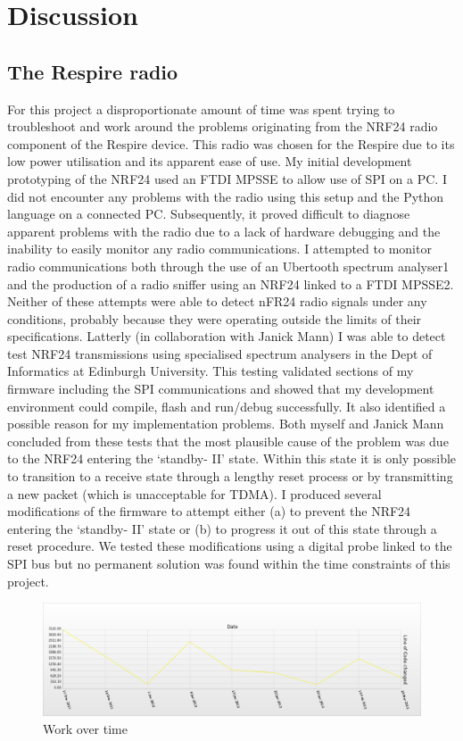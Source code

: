\chapter{Discussion}

\section{The Respire radio}
For this project a disproportionate amount of time was spent trying to troubleshoot and work
around the problems originating from the NRF24 radio component of the Respire device. This radio
was chosen for the Respire due to its low power utilisation and its apparent ease of use. My initial
development prototyping of the NRF24 used an FTDI MPSSE to allow use of SPI on a PC. I did not
encounter any problems with the radio using this setup and the Python language on a connected PC.
Subsequently, it proved difficult to diagnose apparent problems with the radio due to a lack of
hardware debugging and the inability to easily monitor any radio communications. I attempted to
monitor radio communications both through the use of an Ubertooth spectrum analyser1 and the
production of a radio sniffer using an NRF24 linked to a FTDI MPSSE2. Neither of these attempts
were able to detect nFR24 radio signals under any conditions, probably because they were operating
outside the limits of their specifications. Latterly (in collaboration with Janick Mann) I was able to
detect test NRF24 transmissions using specialised spectrum analysers in the Dept of Informatics at
Edinburgh University. This testing validated sections of my firmware including the SPI
communications and showed that my development environment could compile, flash and
run/debug successfully. It also identified a possible reason for my implementation problems. Both
myself and Janick Mann concluded from these tests that the most plausible cause of the problem
was due to the NRF24 entering the ‘standby- II’ state. Within this state it is only possible to
transition to a receive state through a lengthy reset process or by transmitting a new packet (which
is unacceptable for TDMA). I produced several modifications of the firmware to attempt either (a) to
prevent the NRF24 entering the ‘standby- II’ state or (b) to progress it out of this state through a
reset procedure. We tested these modifications using a digital probe linked to the SPI bus but no
permanent solution was found within the time constraints of this project.

\begin{figure}[htb]
  \centering
  \includegraphics[width=\textwidth, keepaspectratio=true]{images/git_work_time.png}
  \caption{Work over time}
  \label{fig:git_work_time}
\end{figure}

